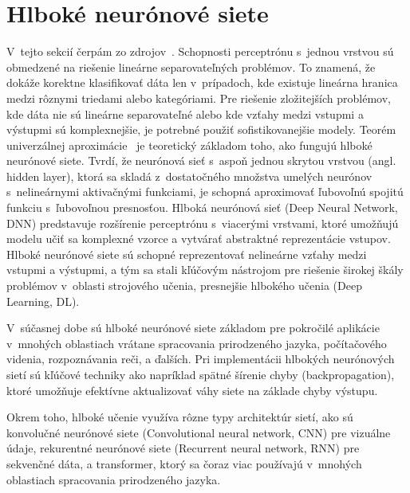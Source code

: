 \section{Hlboké neurónové siete}

V~tejto sekcií čerpám zo zdrojov~\cite{enwiki:1222136552, enwiki:1222140497}. Schopnosti perceptrónu s~jednou vrstvou sú obmedzené na riešenie lineárne separovateľných problémov. To znamená, že dokáže korektne klasifikovať dáta len v~prípadoch, kde existuje lineárna hranica medzi rôznymi triedami alebo kategóriami. Pre riešenie zložitejších problémov, kde dáta nie sú lineárne separovateľné alebo kde vzťahy medzi vstupmi a výstupmi sú komplexnejšie, je potrebné použiť sofistikovanejšie modely. Teorém univerzálnej aproximácie~\cite{enwiki:1221184532} je teoretický základom toho, ako fungujú hlboké neurónové siete. Tvrdí, že neurónová sieť s~aspoň jednou skrytou vrstvou (angl. hidden layer), ktorá sa skladá z~dostatočného množstva umelých neurónov s~nelineárnymi aktivačnými funkciami, je schopná aproximovať ľubovoľnú spojitú funkciu s~ľubovoľnou presnosťou. Hlboká neurónová sieť (Deep Neural Network, DNN) predstavuje rozšírenie perceptrónu s~viacerými vrstvami, ktoré umožňujú modelu učiť sa komplexné vzorce a vytvárať abstraktné reprezentácie vstupov. Hlboké neurónové siete sú schopné reprezentovať nelineárne vzťahy medzi vstupmi a výstupmi, a tým sa stali kľúčovým nástrojom pre riešenie širokej škály problémov v~oblasti strojového učenia, presnejšie hlbokého učenia (Deep Learning, DL).

V~súčasnej dobe sú hlboké neurónové siete základom pre pokročilé aplikácie v~mnohých oblastiach vrátane spracovania prirodzeného jazyka, počítačového videnia, rozpoznávania reči, a ďalších. Pri implementácii hlbokých neurónových sietí sú kľúčové techniky ako napríklad spätné šírenie chyby (backpropagation), ktoré umožňuje efektívne aktualizovať váhy siete na základe chyby výstupu.

Okrem toho, hlboké učenie využíva rôzne typy architektúr sietí, ako sú konvolučné neurónové siete (Convolutional neural network, CNN) pre vizuálne údaje, rekurentné neurónové siete (Recurrent neural network, RNN) pre sekvenčné dáta, a transformer, ktorý sa čoraz viac používajú v~mnohých oblastiach spracovania prirodzeného jazyka.

